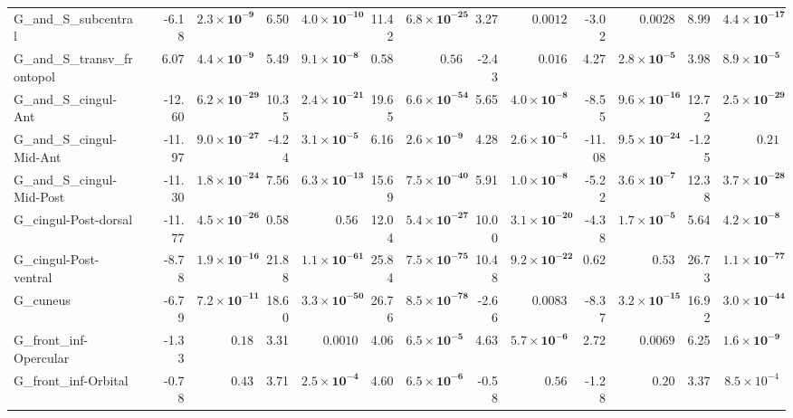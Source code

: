 {\begin{longtable}{llrrrrrrrrrrrr}
G\_and\_S\_subcentral &  & -6.18 & $\mathbf{2.3{\times}10^{-9}}$ & 6.50 & $\mathbf{4.0{\times}10^{-10}}$ & 11.42 & $\mathbf{6.8{\times}10^{-25}}$ & 3.27 & $0.0012$ & -3.02 & $0.0028$ & 8.99 & $\mathbf{4.4{\times}10^{-17}}$ \\
G\_and\_S\_transv\_frontopol &  & 6.07 & $\mathbf{4.4{\times}10^{-9}}$ & 5.49 & $\mathbf{9.1{\times}10^{-8}}$ & 0.58 & $0.56$ & -2.43 & $0.016$ & 4.27 & $\mathbf{2.8{\times}10^{-5}}$ & 3.98 & $\mathbf{8.9{\times}10^{-5}}$ \\
G\_and\_S\_cingul-Ant &  & -12.60 & $\mathbf{6.2{\times}10^{-29}}$ & 10.35 & $\mathbf{2.4{\times}10^{-21}}$ & 19.65 & $\mathbf{6.6{\times}10^{-54}}$ & 5.65 & $\mathbf{4.0{\times}10^{-8}}$ & -8.55 & $\mathbf{9.6{\times}10^{-16}}$ & 12.72 & $\mathbf{2.5{\times}10^{-29}}$ \\
G\_and\_S\_cingul-Mid-Ant &  & -11.97 & $\mathbf{9.0{\times}10^{-27}}$ & -4.24 & $\mathbf{3.1{\times}10^{-5}}$ & 6.16 & $\mathbf{2.6{\times}10^{-9}}$ & 4.28 & $\mathbf{2.6{\times}10^{-5}}$ & -11.08 & $\mathbf{9.5{\times}10^{-24}}$ & -1.25 & $0.21$ \\
G\_and\_S\_cingul-Mid-Post &  & -11.30 & $\mathbf{1.8{\times}10^{-24}}$ & 7.56 & $\mathbf{6.3{\times}10^{-13}}$ & 15.69 & $\mathbf{7.5{\times}10^{-40}}$ & 5.91 & $\mathbf{1.0{\times}10^{-8}}$ & -5.22 & $\mathbf{3.6{\times}10^{-7}}$ & 12.38 & $\mathbf{3.7{\times}10^{-28}}$ \\
G\_cingul-Post-dorsal &  & -11.77 & $\mathbf{4.5{\times}10^{-26}}$ & 0.58 & $0.56$ & 12.04 & $\mathbf{5.4{\times}10^{-27}}$ & 10.00 & $\mathbf{3.1{\times}10^{-20}}$ & -4.38 & $\mathbf{1.7{\times}10^{-5}}$ & 5.64 & $\mathbf{4.2{\times}10^{-8}}$ \\
G\_cingul-Post-ventral &  & -8.78 & $\mathbf{1.9{\times}10^{-16}}$ & 21.88 & $\mathbf{1.1{\times}10^{-61}}$ & 25.84 & $\mathbf{7.5{\times}10^{-75}}$ & 10.48 & $\mathbf{9.2{\times}10^{-22}}$ & 0.62 & $0.53$ & 26.73 & $\mathbf{1.1{\times}10^{-77}}$ \\
G\_cuneus &  & -6.79 & $\mathbf{7.2{\times}10^{-11}}$ & 18.60 & $\mathbf{3.3{\times}10^{-50}}$ & 26.76 & $\mathbf{8.5{\times}10^{-78}}$ & -2.66 & $0.0083$ & -8.37 & $\mathbf{3.2{\times}10^{-15}}$ & 16.92 & $\mathbf{3.0{\times}10^{-44}}$ \\
G\_front\_inf-Opercular &  & -1.33 & $0.18$ & 3.31 & $0.0010$ & 4.06 & $\mathbf{6.5{\times}10^{-5}}$ & 4.63 & $\mathbf{5.7{\times}10^{-6}}$ & 2.72 & $0.0069$ & 6.25 & $\mathbf{1.6{\times}10^{-9}}$ \\
G\_front\_inf-Orbital &  & -0.78 & $0.43$ & 3.71 & $\mathbf{2.5{\times}10^{-4}}$ & 4.60 & $\mathbf{6.5{\times}10^{-6}}$ & -0.58 & $0.56$ & -1.28 & $0.20$ & 3.37 & $8.5{\times}10^{-4}$ \\

\end{longtable}}
